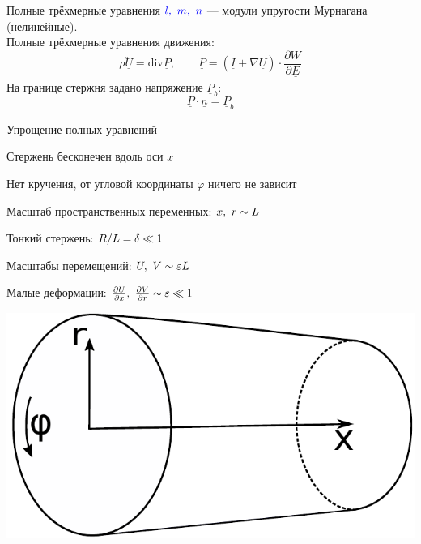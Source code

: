 \documentclass[usenames,dvipsnames]{beamer}
\newcommand{\vect}[1]{\underline{#1}}
\newcommand{\tens}[1]{\underline{\underline{#1}}}
\newcommand{\divg}{\text{div}}
\newcommand{\pdiff}[2]{\frac{\partial #1}{\partial #2}}
\begin{document}
\begin{frame}{Полные трёхмерные уравнения}
$\color{blue}l,\ m,\ n$ --- модули упругости Мурнагана (нелинейные).\\
\vspace{1mm}
\normalsize
Полные трёхмерные уравнения движения:
\begin{equation}\nonumber
\rho\ddot{\vect{U}} = \divg\tens{P}, \qquad \tens{P} = (\tens{I} + \nabla\vect{U}) \cdot \pdiff{W}{\tens{E}}
\end{equation}
На границе стержня задано напряжение $\vect{P}_b$:
\begin{equation}\nonumber
\tens{P}\cdot \vect{n} = \vect{P}_b
\end{equation}
\end{frame}


\begin{frame}{Упрощение полных уравнений}
\begin{itemize}%
	\hspace{-3mm}
	\begin{minipage}{.53\textwidth}
	\item Стержень бесконечен вдоль оси $x$
	\item Нет кручения, от угловой координаты $\varphi$ ничего не зависит
	\item Масштаб пространственных переменных: $\color{black}x,\ r \sim L$
	\item Тонкий стержень: $\color{black}R/L = \delta \ll 1$
	\item Масштабы перемещений: $\color{black}U,\ V \sim \varepsilon L$
	\item Малые деформации: $\color{black}\pdiff{U}{x},\ \pdiff{V}{r} \sim \varepsilon \ll 1$
	\end{minipage}
	\hspace{3mm}
	\begin{minipage}{.36\textwidth}
		\includegraphics[width=\linewidth]{Figures/1_RodSchematic}\\

\end{minipage}
\end{itemize}
\end{frame}
\end{document}
